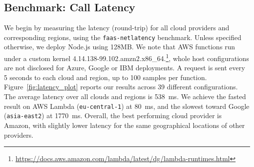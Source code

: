 \subsection{Benchmark: Call Latency}
We begin by measuring the latency (round-trip) for all cloud providers and corresponding regions, using the \texttt{faas-netlatency} benchmark.
Unless specified otherwise, we deploy Node.js using 128\gls{MB}.
We note that AWS functions run under a custom kernel 4.14.138-99.102.amzn2.x86\_64.\footnote{\url{https://docs.aws.amazon.com/lambda/latest/dg/lambda-runtimes.html}}, 
whole host configurations are not disclosed for Azure, Google or IBM deployments.
A request is sent every 5 seconds to each cloud and region, up to 100 samples per function.
Figure~\ref{fig:latency_plot} reports our results across 39 different configurations. 
The average latency over all clouds and regions is 538~ms.
We achieve the fasted result on AWS Lambda (\texttt{eu-central-1}) at 80~ms, and the slowest toward Google (\texttt{asia-east2}) at 1770~ms. 
Overall, the best performing cloud provider is Amazon, with slightly lower latency for the same geographical locations of other providers.

